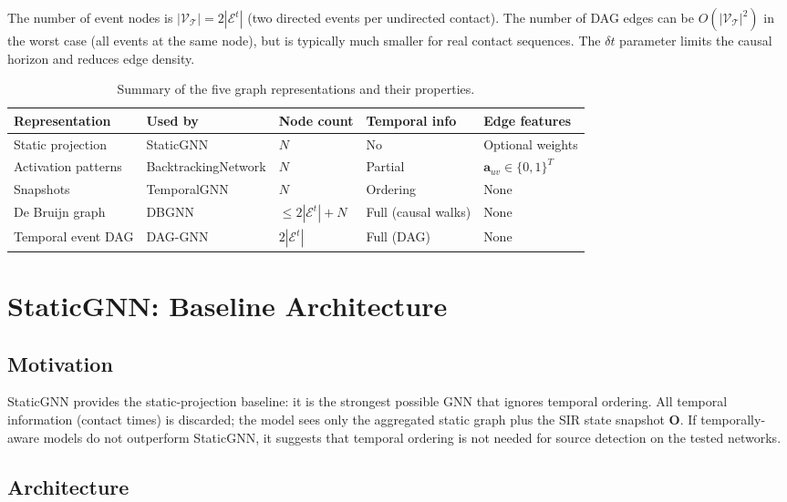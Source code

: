 \documentclass[12pt,a4paper]{report}
\newcommand{\calV}{\mathcal{V}}
\newcommand{\calE}{\mathcal{E}}
\begin{document}
The number of event nodes is $|\calV_\mathcal{T}| = 2|\calE^t|$ (two directed
events per undirected contact). The number of DAG edges can be $O(|\calV_\mathcal{T}|^2)$
in the worst case (all events at the same node), but is typically much smaller
for real contact sequences. The $\delta t$ parameter limits the causal horizon
and reduces edge density.

\begin{table}[H]
\centering
\caption{Summary of the five graph representations and their properties.}
\label{tab:representations}
\begin{tabular}{lllll}
\toprule
Representation & Used by & Node count & Temporal info & Edge features \\
\midrule
Static projection & StaticGNN & $N$ & No & Optional weights \\
Activation patterns & BacktrackingNetwork & $N$ & Partial & $\mathbf{a}_{uv} \in \{0,1\}^T$ \\
Snapshots & TemporalGNN & $N$ & Ordering & None \\
De Bruijn graph & DBGNN & $\leq 2|\calE^t| + N$ & Full (causal walks) & None \\
Temporal event DAG & DAG-GNN & $2|\calE^t|$ & Full (DAG) & None \\
\bottomrule
\end{tabular}
\end{table}

\chapter{StaticGNN: Baseline Architecture}
\label{chap:static_gnn}

\section{Motivation}

StaticGNN provides the static-projection baseline: it is the strongest possible
GNN that ignores temporal ordering. All temporal information (contact times) is
discarded; the model sees only the aggregated static graph plus the SIR state
snapshot $\mathbf{O}$. If temporally-aware models do not outperform StaticGNN,
it suggests that temporal ordering is not needed for source detection on the
tested networks.

\section{Architecture}
\end{document}
